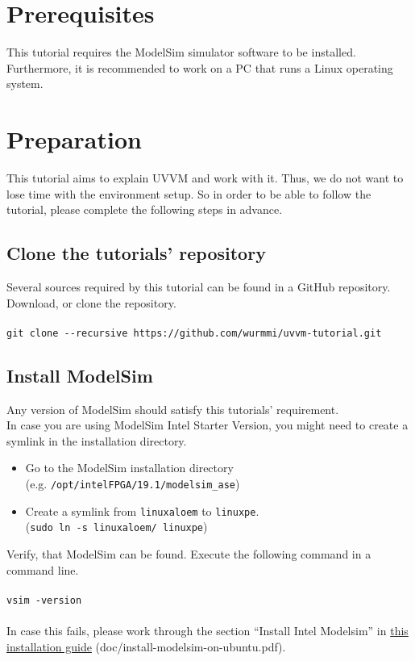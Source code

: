 \section{Prerequisites}

This tutorial requires the ModelSim simulator software to be installed.
Furthermore, it is recommended to work on a PC that runs a Linux operating system.

\section{Preparation}

This tutorial aims to explain UVVM and work with it.
Thus, we do not want to lose time with the environment setup.
So in order to be able to follow the tutorial, please complete the
following steps in advance.

\subsection{Clone the tutorials' repository}

Several sources required by this tutorial can be found in a GitHub repository.\\
Download, or clone the repository.\\
\\
\texttt{git clone -{}-recursive https://github.com/wurmmi/uvvm-tutorial.git }

\subsection{Install ModelSim}

Any version of ModelSim should satisfy this tutorials' requirement.\\

In case you are using ModelSim Intel Starter Version, you might need to
create a symlink in the installation directory.
\begin{itemize}
      \item Go to the ModelSim installation directory\\
            (e.g. \texttt{/opt/intelFPGA/19.1/modelsim\_ase})
      \item Create a symlink from \texttt{linuxaloem} to \texttt{linuxpe}.\\
            (\texttt{sudo ln -s linuxaloem/ linuxpe})
\end{itemize}

Verify, that ModelSim can be found. Execute the following command in a command line.\\
\\
\texttt{vsim -version}\\
\\
In case this fails, please work through the section ``Install Intel Modelsim''
in \href{../install-modelsim-on-ubuntu.pdf}{this installation guide} (doc/install-modelsim-on-ubuntu.pdf).

\newpage
